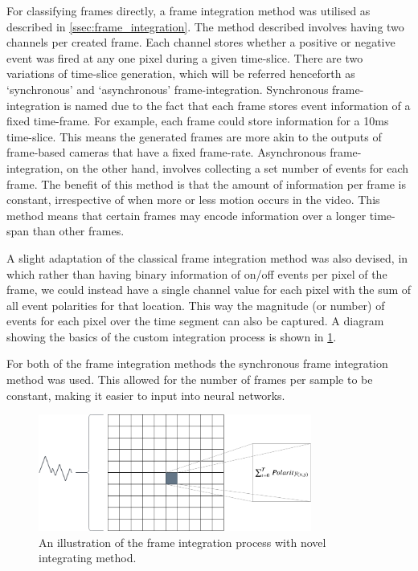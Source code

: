 For classifying frames directly, a frame integration method was utilised as described in \cref{ssec:frame_integration}. The method described involves having two channels per created frame. Each channel stores whether a positive or negative event was fired at any one pixel during a given time-slice. There are two variations of time-slice generation, which will be referred henceforth as `synchronous' and `asynchronous' frame-integration. Synchronous frame-integration is named due to the fact that each frame stores event information of a fixed time-frame. For example, each frame could store information for a 10ms time-slice. This means the generated frames are more akin to the outputs of frame-based cameras that have a fixed frame-rate. Asynchronous frame-integration, on the other hand, involves collecting a set number of events for each frame. The benefit of this method is that the amount of information per frame is constant, irrespective of when more or less motion occurs in the video. This method means that certain frames may encode information over a longer time-span than other frames.

A slight adaptation of the classical frame integration method was also devised, in which rather than having binary information of on/off events per pixel of the frame, we could instead have a single channel value for each pixel with the sum of all event polarities for that location. This way the magnitude (or number) of events for each pixel over the time segment can also be captured. A diagram showing the basics of the custom integration process is shown in \cref{fig:frame_integration_diagram}.

For both of the frame integration methods the synchronous frame integration method was used. This allowed for the number of frames per sample to be constant, making it easier to input into neural networks.

\begin{figure}[htb]
    \centering
    \includegraphics[width=0.8\textwidth]{analysisanddesign/images/frame_integration_illustration.png}
    \caption{An illustration of the frame integration process with novel integrating method.}
    \label{fig:frame_integration_diagram}
\end{figure}

